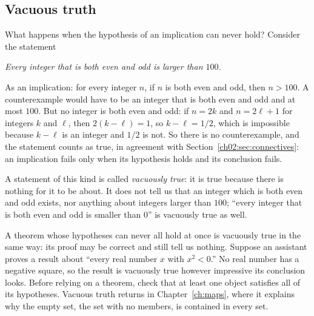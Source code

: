 \subsection*{Vacuous truth}
What happens when the hypothesis of an implication can never hold? Consider the statement
\begin{center}
\emph{Every integer that is both even and odd is larger than $100$.}
\end{center}
As an implication: for every integer $n$, if $n$ is both even and odd, then $n>100$. A counterexample would have to be an integer that is both even and odd and at most $100$. But no integer is both even and odd: if $n=2k$ and $n=2\ell+1$ for integers $k$ and $\ell$, then $2(k-\ell)=1$, so $k-\ell=1/2$, which is impossible because $k-\ell$ is an integer and $1/2$ is not. So there is no counterexample, and the statement counts as true, in agreement with Section~\ref{ch02:sec:connectives}: an implication fails only when its hypothesis holds and its conclusion fails.

A statement of this kind is called \emph{vacuously true}: it is true because there is nothing for it to be about. It does not tell us that an integer which is both even and odd exists, nor anything about integers larger than $100$; ``every integer that is both even and odd is smaller than $0$'' is vacuously true as well.

A theorem whose hypotheses can never all hold at once is vacuously true in the same way: its proof may be correct and still tell us nothing. Suppose an assistant proves a result about ``every real number $x$ with $x^2<0$.'' No real number has a negative square, so the result is vacuously true however impressive its conclusion looks. Before relying on a theorem, check that at least one object satisfies all of its hypotheses. Vacuous truth returns in Chapter~\ref{ch:maps}, where it explains why the empty set, the set with no members, is contained in every set.

